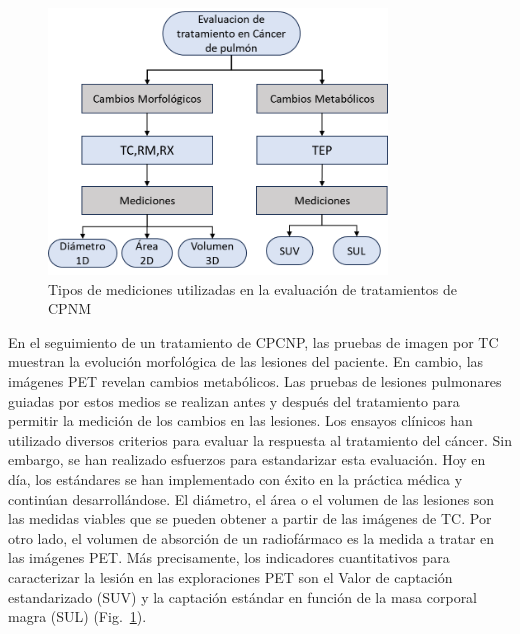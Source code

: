 \documentclass[11pt,a4paper,openany]{article}
\begin{document}
    \begin{figure}[H]
    \centering
    \includegraphics[width=9cm]{TypeofEvaluation-Diagram.png}
    \caption{Tipos de mediciones utilizadas en la evaluación de tratamientos de CPNM\label{fig:TOE}}
    \end{figure}

    En el seguimiento de un tratamiento de CPCNP, las pruebas de imagen por TC muestran la evolución morfológica de las lesiones del paciente. En cambio, las imágenes PET revelan cambios metabólicos. Las pruebas de lesiones pulmonares guiadas por estos medios se realizan antes y después del tratamiento para permitir la medición de los cambios en las lesiones. Los ensayos clínicos han utilizado diversos criterios para evaluar la respuesta al tratamiento del cáncer. Sin embargo, se han realizado esfuerzos para estandarizar esta evaluación. Hoy en día, los estándares se han implementado con éxito en la práctica médica y continúan desarrollándose. El diámetro, el área o el volumen de las lesiones son las medidas viables que se pueden obtener a partir de las imágenes de TC. Por otro lado, el volumen de absorción de un radiofármaco es la medida a tratar en las imágenes PET. Más precisamente, los indicadores cuantitativos para caracterizar la lesión en las exploraciones PET son el Valor de captación estandarizado (SUV) y la captación estándar en función de la masa corporal magra (SUL) (Fig.~\ref{fig:TOE}). \\

    
\end{document}
